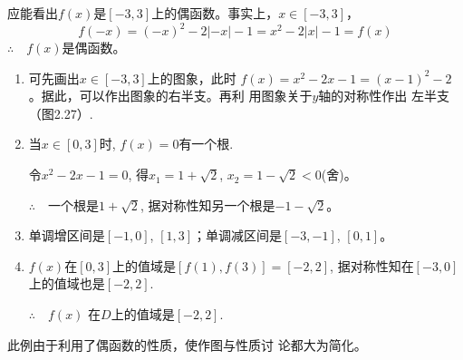 \begin{solution}
    应能看出$f(x)$是$[-3,3]$上的偶函数。事实上，$x\in[-3,3]$，
\[f(-x)=(-x)^2-2|-x|-1=x^2-2|x|-1=f(x)\]
$\therefore\quad f(x)$是偶函数。

\begin{enumerate}[(1)]
    \item 可先画出$x\in[-3,3]$上的图象，此时
$f(x)=x^2-2x-1=(x-1)^2-2$。据此，可以作出图象的右半支。再利
用图象关于$y$轴的对称性作出
左半支（图2.27）.
\item 当$x\in[0,3]$时, $f(x)=0$有一个根.

令$x^{2}-2x-1=0$, 得$x_1= 1+ \sqrt {2}$, $x_2= 1- \sqrt {2}< 0$(舍)。

$\therefore\quad$一个根是$1+\sqrt2$, 据对称性知另一个根是$-1-\sqrt{2}$。

\item 单调增区间是$[-1,0]$, $[1,3]$；单调减区间是$[-3,-1]$, $[0,1]$。
\item $f(x)$在$[0,3]$上的值域是$[f(1), f(3)]=[-2,2]$, 据对称性知在$[-3,0]$上的值域也是$[-2,2]$.

$\therefore\quad f(x)$
在$D$上的值域是$[-2,2]$.
\end{enumerate}
\end{solution}

\begin{note}
    此例由于利用了偶函数的性质，使作图与性质讨
论都大为简化。
\end{note}

